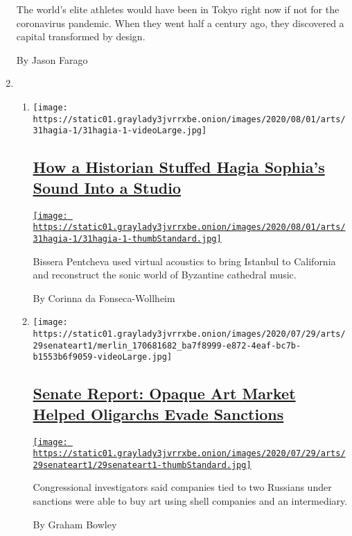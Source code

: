 \begin{enumerate}
  The world's elite athletes would have been in Tokyo right now if not
  for the coronavirus pandemic. When they went half a century ago, they
  discovered a capital transformed by design.

  By Jason Farago
\item
  \begin{enumerate}
  \def\labelenumii{\arabic{enumii}.}
  \item
    \texttt{[image: https://static01.graylady3jvrrxbe.onion/images/2020/08/01/arts/31hagia-1/31hagia-1-videoLarge.jpg]}

    \hypertarget{how-a-historian-stuffed-hagia-sophias-sound-into-a-studio}{%
    \subsection{\texorpdfstring{\href{/2020/07/30/arts/music/hagia-sophia-acoustics-music.html}{How
    a Historian Stuffed Hagia Sophia's Sound Into a
    Studio}}{How a Historian Stuffed Hagia Sophia's Sound Into a Studio}}\label{how-a-historian-stuffed-hagia-sophias-sound-into-a-studio}}

    \href{/2020/07/30/arts/music/hagia-sophia-acoustics-music.html}{\texttt{[image: https://static01.graylady3jvrrxbe.onion/images/2020/08/01/arts/31hagia-1/31hagia-1-thumbStandard.jpg]}}

    Bissera Pentcheva used virtual acoustics to bring Istanbul to
    California and reconstruct the sonic world of Byzantine cathedral
    music.

    By Corinna da Fonseca-Wollheim
  \item
    \texttt{[image: https://static01.graylady3jvrrxbe.onion/images/2020/07/29/arts/29senateart1/merlin\_170681682\_ba7f8999-e872-4eaf-bc7b-b1553b6f9059-videoLarge.jpg]}

    \hypertarget{senate-report-opaque-art-market-helped-oligarchs-evade-sanctions}{%
    \subsection{\texorpdfstring{\href{/2020/07/29/arts/design/senate-report-art-market-russia-oligarchs-sanctions.html}{Senate
    Report: Opaque Art Market Helped Oligarchs Evade
    Sanctions}}{Senate Report: Opaque Art Market Helped Oligarchs Evade Sanctions}}\label{senate-report-opaque-art-market-helped-oligarchs-evade-sanctions}}

    \href{/2020/07/29/arts/design/senate-report-art-market-russia-oligarchs-sanctions.html}{\texttt{[image: https://static01.graylady3jvrrxbe.onion/images/2020/07/29/arts/29senateart1/29senateart1-thumbStandard.jpg]}}

    Congressional investigators said companies tied to two Russians
    under sanctions were able to buy art using shell companies and an
    intermediary.

    By Graham Bowley
  \end{enumerate}
\end{enumerate}


